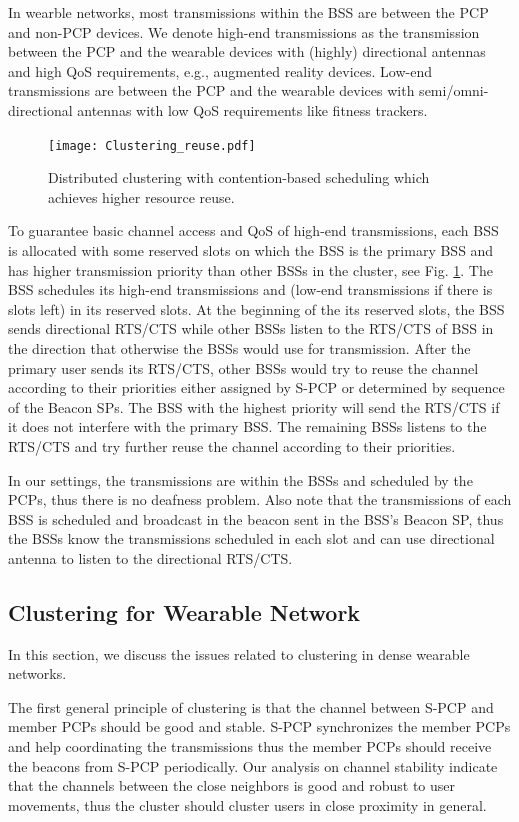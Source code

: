 \documentclass[10pt, conference, letterpaper]{IEEEtran}
\begin{document}
In wearble networks, most transmissions within the BSS are between the PCP and non-PCP devices. We denote high-end transmissions as the transmission between the PCP and the wearable devices with (highly) directional antennas and high QoS requirements, e.g., augmented reality devices. Low-end transmissions are between the PCP and the wearable devices with semi/omni-directional antennas with low QoS requirements like fitness trackers. 

\begin{figure}
	\centering
	\texttt{[image: Clustering\_reuse.pdf]}
	\caption{Distributed clustering  with contention-based scheduling which achieves higher resource reuse.}
	\label{fig:clustering:reuse}
\end{figure}

To guarantee basic channel access and QoS of high-end transmissions, each BSS is allocated with some reserved slots on which the BSS is the primary BSS and has higher transmission priority than other BSSs in the cluster, see Fig. \ref{fig:clustering:reuse}. The BSS schedules its high-end transmissions and (low-end transmissions if there is slots left) in its reserved slots. At the beginning of the its reserved slots, the BSS sends directional RTS/CTS while other BSSs listen to the RTS/CTS of BSS in the direction that otherwise the BSSs would use for transmission. After the primary user sends its RTS/CTS, other BSSs would try to reuse the channel according to their priorities either assigned by S-PCP or determined by sequence of the Beacon SPs. The BSS with the highest priority will send the RTS/CTS if it does not interfere with the primary BSS. The remaining BSSs listens to the RTS/CTS and try further reuse the channel according to their priorities. 

In our settings, the transmissions are within the BSSs and scheduled by the PCPs, thus there is no deafness problem. Also note that the transmissions of each BSS is scheduled and broadcast in the beacon sent in the BSS's Beacon SP, thus the BSSs know the transmissions scheduled in each slot and can use directional antenna to listen to the directional RTS/CTS. 

\subsection{Clustering for Wearable Network}\label{section:MAC:clustering}
In this section, we discuss the issues related to clustering in dense wearable networks.

The first general principle of clustering is that the channel between S-PCP and member PCPs should be good and stable. S-PCP synchronizes the member PCPs and help coordinating the transmissions thus the member PCPs should receive the beacons from S-PCP periodically. Our analysis on channel stability indicate that the channels between the close neighbors is good and robust to user movements, thus the cluster should cluster users in close proximity in general. 
\end{document}
